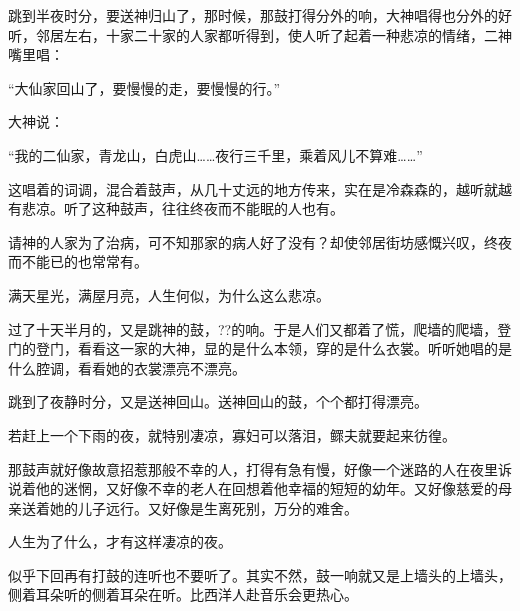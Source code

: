 \par 跳到半夜时分，要送神归山了，那时候，那鼓打得分外的响，大神唱得也分外的好听，邻居左右，十家二十家的人家都听得到，使人听了起着一种悲凉的情绪，二神嘴里唱：
\par “大仙家回山了，要慢慢的走，要慢慢的行。”
\par 大神说：
\par “我的二仙家，青龙山，白虎山……夜行三千里，乘着风儿不算难……”
\par 这唱着的词调，混合着鼓声，从几十丈远的地方传来，实在是冷森森的，越听就越有悲凉。听了这种鼓声，往往终夜而不能眠的人也有。
\par 请神的人家为了治病，可不知那家的病人好了没有？却使邻居街坊感慨兴叹，终夜而不能已的也常常有。
\par 满天星光，满屋月亮，人生何似，为什么这么悲凉。
\par 过了十天半月的，又是跳神的鼓，??的响。于是人们又都着了慌，爬墙的爬墙，登门的登门，看看这一家的大神，显的是什么本领，穿的是什么衣裳。听听她唱的是什么腔调，看看她的衣裳漂亮不漂亮。
\par 跳到了夜静时分，又是送神回山。送神回山的鼓，个个都打得漂亮。
\par 若赶上一个下雨的夜，就特别凄凉，寡妇可以落泪，鳏夫就要起来彷徨。
\par 那鼓声就好像故意招惹那般不幸的人，打得有急有慢，好像一个迷路的人在夜里诉说着他的迷惘，又好像不幸的老人在回想着他幸福的短短的幼年。又好像慈爱的母亲送着她的儿子远行。又好像是生离死别，万分的难舍。
\par 人生为了什么，才有这样凄凉的夜。
\par 似乎下回再有打鼓的连听也不要听了。其实不然，鼓一响就又是上墙头的上墙头，侧着耳朵听的侧着耳朵在听。比西洋人赴音乐会更热心。
